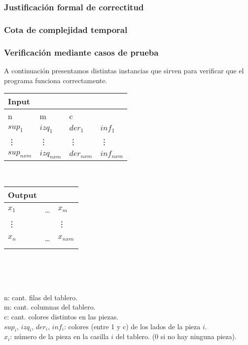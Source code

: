 \documentclass[11pt, a4paper, twoside]{article}
\begin{document}
\subsubsection{Justificación formal de correctitud}

\subsubsection{Cota de complejidad temporal}

\subsubsection{Verificación mediante casos de prueba}

A continuación presentamos distintas instancias que sirven para verificar que el programa funciona correctamente.\\ 

\begin{minipage}{0.5\textwidth}
	\begin{tabular}{llll}
		Input  \\
		\hline
		n       & m       & c       &         \\
		$sup_1$ & $izq_1$ & $der_1$ & $inf_1$ \\
		\vdots & \vdots   & \vdots  & \vdots  \\
		$sup_{nxm}$ & $izq_{nxm}$ & $der_{nxm}$ & $inf_{nxm}$ \\ 
	\end{tabular} \\  
\end{minipage}
\begin{minipage}{0.5\textwidth}	
	\begin{tabular}{lll}
		Output  \\
		\hline
		$x_1$ & \dots & $x_m$ \\
		\vdots&       & \vdots \\
		$x_n$ & \dots & $x_{nxm}$ \\
		 \\
	\end{tabular} \\
\end{minipage} \\
\\
n: cant. filas del tablero. \\
m: cant. columnas del tablero. \\
c: cant. colores distintos en las piezas. \\
$sup_i$, $izq_i$, $der_i$, $inf_i$: colores (entre 1 y c) de los lados de la pieza $i$. \\
$x_i$: número de la pieza en la casilla $i$ del tablero. ($0$ si no hay ninguna pieza). \\
\\
\end{document}
